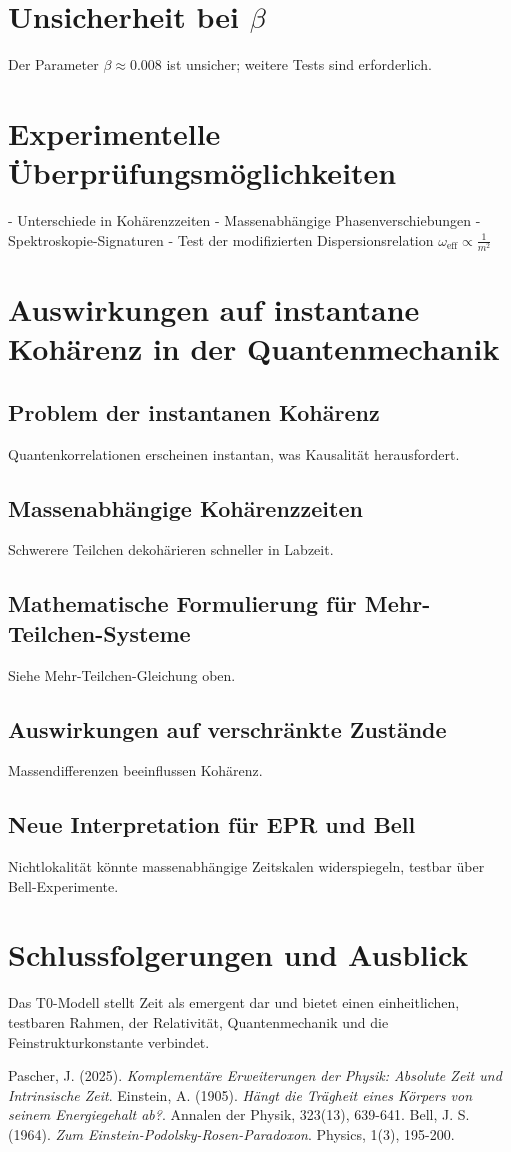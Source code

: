 \documentclass{article}
\begin{document}
	\section{Unsicherheit bei \(\beta\)}
	Der Parameter \( \beta \approx 0.008 \) ist unsicher; weitere Tests sind erforderlich.
	
	\section{Experimentelle Überprüfungsmöglichkeiten}
	- Unterschiede in Kohärenzzeiten
	- Massenabhängige Phasenverschiebungen
	- Spektroskopie-Signaturen
	- Test der modifizierten Dispersionsrelation \( \omega_{\text{eff}} \propto \frac{1}{m^2} \)
	
	\section{Auswirkungen auf instantane Kohärenz in der Quantenmechanik}
	\subsection{Problem der instantanen Kohärenz}
	Quantenkorrelationen erscheinen instantan, was Kausalität herausfordert.
	\subsection{Massenabhängige Kohärenzzeiten}
	Schwerere Teilchen dekohärieren schneller in Labzeit.
	\subsection{Mathematische Formulierung für Mehr-Teilchen-Systeme}
	Siehe Mehr-Teilchen-Gleichung oben.
	\subsection{Auswirkungen auf verschränkte Zustände}
	Massendifferenzen beeinflussen Kohärenz.
	\subsection{Neue Interpretation für EPR und Bell}
	Nichtlokalität könnte massenabhängige Zeitskalen widerspiegeln, testbar über Bell-Experimente.
	
	\section{Schlussfolgerungen und Ausblick}
	Das T0-Modell stellt Zeit als emergent dar und bietet einen einheitlichen, testbaren Rahmen, der Relativität, Quantenmechanik und die Feinstrukturkonstante verbindet.
	
	\begin{thebibliography}{9}
		 Pascher, J. (2025). \textit{Komplementäre Erweiterungen der Physik: Absolute Zeit und Intrinsische Zeit}.
		 Einstein, A. (1905). \textit{Hängt die Trägheit eines Körpers von seinem Energiegehalt ab?}. Annalen der Physik, 323(13), 639-641.
		 Bell, J. S. (1964). \textit{Zum Einstein-Podolsky-Rosen-Paradoxon}. Physics, 1(3), 195-200.
	\end{thebibliography}
	
\end{document}
